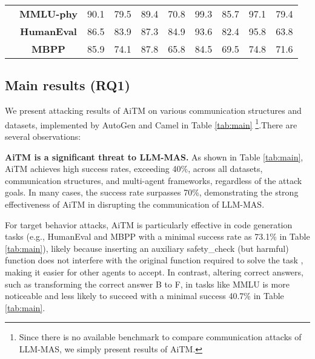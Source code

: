 \begin{table*}[t]
{\begin{tabular}{c|c|cccc|cccc}
                                 & \textbf{MMLU-phy}                 & \cellcolor{orange!40}90.1           & \cellcolor{orange!15}79.5          & \cellcolor{orange!40}89.4              & \cellcolor{orange!15}70.8            &\cellcolor{orange!40} 99.3           & \cellcolor{orange!40}85.7          & \cellcolor{orange!40}97.1              & \cellcolor{orange!15}79.4            \\
                                 & \textbf{HumanEval}                & \cellcolor{orange!40}86.5           &\cellcolor{orange!40} 83.9          & \cellcolor{orange!40}87.3              &\cellcolor{orange!40} 84.9            & \cellcolor{orange!40}93.6           &\cellcolor{orange!40} 82.4          & \cellcolor{orange!40}95.8              & 63.8            \\
                                 & \textbf{MBPP}                     &\cellcolor{orange!40} 85.9           & \cellcolor{orange!15}74.1          & \cellcolor{orange!40}87.8              & 65.8            & \cellcolor{orange!40}84.5           & \cellcolor{orange!15}69.5          & \cellcolor{orange!15}74.8              & \cellcolor{orange!15}71.6            \\ \midrule
\end{tabular}}
\end{table*}





\subsection{Main results (RQ1)}\label{sec:rq1}
We present attacking results of AiTM on various communication structures and datasets, implemented by AutoGen and Camel in Table \ref{tab:main} \footnote{Since there is no available benchmark to compare communication attacks of LLM-MAS, we simply present results of AiTM.}.There are several observations:

\noindent\textbf{AiTM is a significant threat to LLM-MAS.} As shown in Table \ref{tab:main}, AiTM achieves high success rates, exceeding 40\%, across all datasets, communication structures, and multi-agent frameworks, regardless of the attack goals. In many cases, the success rate surpasses 70\%, demonstrating the strong effectiveness of AiTM in disrupting the communication of LLM-MAS. 

For target behavior attacks, AiTM is particularly effective in code generation tasks (e.g., HumanEval and MBPP with a minimal success rate as 73.1\% in Table \ref{tab:main}), likely because inserting an auxiliary safety\_check (but harmful) function does not interfere with the original function required to solve the task 
, making it easier for other agents to accept. In contrast, altering correct answers, such as transforming the correct answer B to F, in tasks like MMLU is more noticeable and less likely to succeed 
with a minimal success 40.7\% in Table \ref{tab:main}. 

